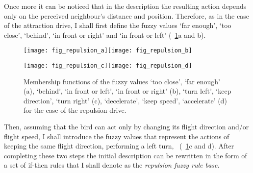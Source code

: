 Once more it can be noticed that in the description the resulting action depends only on the perceived neighbour's distance and position. Therefore, as in the case of the attraction drive, I shall first define the fuzzy values `far enough', `too close', `behind', `in front or right' and `in front or left' (\figs~\ref{fig:fuzzyAnimat:Dr:afd}a and b). 
%
\begin{figure}
	\null\vspace*{2mm}\par
	\texttt{[image: fig\_repulsion\_a]}\hspace*{2mm}\texttt{[image: fig\_repulsion\_b]}
	\par\vspace*{2mm}
	\texttt{[image: fig\_repulsion\_c]}\hspace*{2mm}\texttt{[image: fig\_repulsion\_d]}
	\par\vspace*{2mm}
	\caption{Membership functions of the fuzzy values `too close', `far enough' (a), `behind', `in front or left', `in front or right' (b), `turn left', `keep direction', `turn right' (c), `decelerate', `keep speed', `accelerate' (d) for the case of the repulsion drive.}
	\label{fig:fuzzyAnimat:Dr:afd}
\end{figure}
%
Then, assuming that the bird can act only by changing its flight direction and/or flight speed, I shall introduce the fuzzy values that represent the actions of keeping the same flight direction, performing a left turn, \etc\ (\figs~\ref{fig:fuzzyAnimat:Dr:afd}c and d). After completing these two steps the initial description can be rewritten in the form of a set of if-then rules that I shall denote as the \emph{repulsion fuzzy rule base}.

